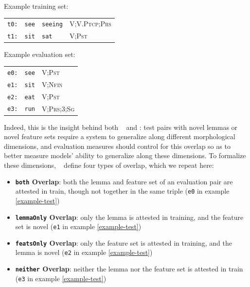 \documentclass[11pt]{article}
\newcommand{\goldmant}{\citet{goldman-etal-2022-un}}
\newcommand{\kodnert}{\citet{kodner-etal-2022-sigmorphon}}
\begin{document}
\begin{exe}
\ex\label{example-train} Example training set: \\
\begin{small}
\begin{tabular}{llll}
\texttt{t0:} & \texttt{see} & \texttt{seeing} & \textsc{V;V.Ptcp;Prs}\\
\texttt{t1:} & \texttt{sit} & \texttt{sat} & \textsc{V;Pst}\\
\end{tabular}
\end{small}
\ex\label{example-test} Example evaluation set:\\
\begin{small}
\begin{tabular}{lll}
\texttt{e0:} & \texttt{see} &  \textsc{V;Pst}\\
\texttt{e1:} & \texttt{sit} & \textsc{V;Nfin}\\
\texttt{e2:} & \texttt{eat} & \textsc{V;Pst}\\
\texttt{e3:} & \texttt{run} & \textsc{V;Prs;3;Sg}\\
\end{tabular}
\end{small}
\end{exe}

Indeed, this is the insight behind both \goldmant~ and \kodnert:  test pairs with novel lemmas or novel feature sets require a system to generalize along different morphological dimensions, and evaluation measures  should control for this overlap so as to better measure models' ability to generalize along these dimensions. 
To formalize these dimensions, \kodnert~ define four types of overlap, which we repeat here: 
\begin{itemize}
\item \textbf{\texttt{both} Overlap}: both the lemma and feature set of an evaluation pair are attested in train, though not together in the same triple (\texttt{e0} in example \ref{example-test})
\item \textbf{\texttt{lemmaOnly} Overlap}: only the lemma is attested in training, and the feature set is novel (\texttt{e1} in example \ref{example-test})
\item \textbf{\texttt{featsOnly} Overlap}: only the feature set is attested in training, and the lemma is novel (\texttt{e2} in example \ref{example-test})
\item \textbf{\texttt{neither} Overlap}: neither the lemma nor the feature set is attested in train (\texttt{e3} in example \ref{example-test})
\end{itemize} 
\end{document}
